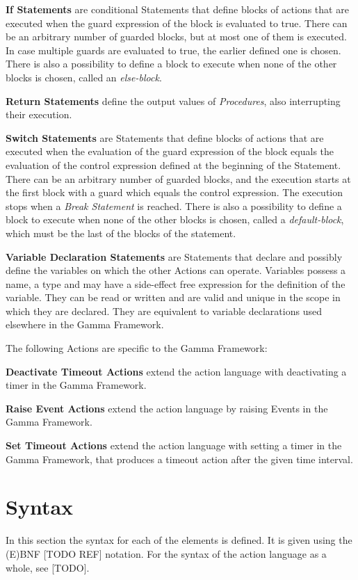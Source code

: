 \textbf{If Statements} are conditional Statements that define blocks of actions that are executed when the guard expression of the block is evaluated to true. There can be an arbitrary number of guarded blocks, but at most one of them is executed. In case multiple guards are evaluated to true, the earlier defined one is chosen. There is also a possibility to define a block to execute when none of the other blocks is chosen, called an \textit{else-block}.

\textbf{Return Statements} define the output values of \textit{Procedures}, also interrupting their execution.

\textbf{Switch Statements} are Statements that define blocks of actions that are executed when the evaluation of the guard expression of the block equals the evaluation of the control expression defined at the beginning of the Statement. There can be an arbitrary number of guarded blocks, and the execution starts at the first block with a guard which equals the control expression. The execution stops when a \textit{Break Statement} is reached. There is also a possibility to define a block to execute when none of the other blocks is chosen, called a \textit{default-block}, which must be the last of the blocks of the statement.

\textbf{Variable Declaration Statements} are Statements that declare and possibly define the variables on which the other Actions can operate. Variables possess a name, a type and may have a side-effect free expression for the definition of the variable. They can be read or written and are valid and unique in the scope in which they are declared. They are equivalent to variable declarations used  elsewhere in the Gamma Framework.

\bigskip
The following Actions are specific to the Gamma Framework:

\textbf{Deactivate Timeout Actions} extend the action language with deactivating a timer in the Gamma Framework.

\textbf{Raise Event Actions} extend the action language by raising Events in the Gamma Framework.

\textbf{Set Timeout Actions} extend the action language with setting a timer in the Gamma Framework, that produces a timeout action after the given time interval.


\section{Syntax} \label{section_tr_syntax}
In this section the syntax for each of the elements is defined. It is given using the (E)BNF [TODO REF] notation. For the syntax of the action language as a whole, see [TODO].


